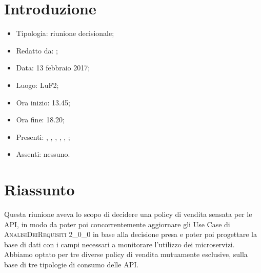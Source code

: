 \section{Introduzione}

	\begin{itemize}
		\item Tipologia: riunione decisionale;
		\item Redatto da: \DS;
		\item Data: 13 febbraio 2017;
		\item Luogo: LuF2;
		\item Ora inizio: 13.45;
		\item Ora fine: 18.20;
		\item Presenti: \AN, \DAN, \DS, \AS, \NS, \MC;
		\item Assenti: nessuno.		
	\end{itemize}

\section{Riassunto}
Questa riunione aveva lo scopo di decidere una policy di vendita sensata per le API, in modo da poter poi concorrentemente aggiornare gli Use Case di \textsc{AnalisiDeiRequisiti 2\_0\_0} in base alla decisione presa e poter poi progettare la base di dati con i campi necessari a monitorare l'utilizzo dei microservizi. Abbiamo optato per tre diverse policy di vendita mutuamente esclusive, sulla base di tre tipologie di consumo delle API.


